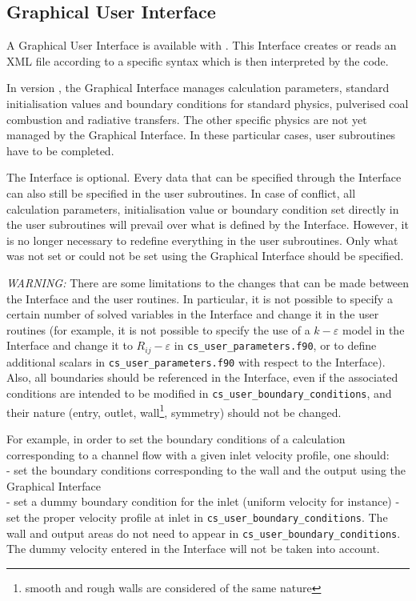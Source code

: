 {{{%
\subsection{Graphical User Interface}
\label{prg_gui}%
A Graphical User Interface is available with \CS.
This Interface creates or reads an XML file according to
a specific \CS syntax which is then interpreted by the code.

In version \verscs, the Graphical Interface manages calculation parameters,
standard initialisation values and boundary
conditions for standard physics, pulverised coal combustion and radiative
transfers. The other specific
physics are not yet managed by the Graphical
Interface. In these particular cases, user subroutines have to be completed.

The Interface is optional. Every data that can be specified through the
Interface can also still be specified in the user subroutines. In case of
conflict, all calculation parameters, initialisation value or boundary condition
set directly in the user subroutines will prevail over what is defined by the
Interface. However, it is no longer necessary to redefine everything in the
user subroutines. Only what was not set or could not be set using the Graphical
Interface should be specified.

{\em WARNING: }
There are some limitations to the changes that can be made between the Interface
and the user routines. In particular, it is not possible to specify a certain
number of solved variables in the Interface and change it in the user routines
(for example, it is not possible to specify the use of a $k-\varepsilon$ model
in the Interface and change it to $R_{ij}-\varepsilon$ in \texttt{cs\_user\_parameters.f90}, or
to define additional scalars in \texttt{cs\_user\_parameters.f90} with respect to the
Interface). Also, all boundaries should be referenced in the Interface, even if
the associated conditions are intended to be modified in \texttt{cs\_user\_boundary\_conditions}, and
their nature (entry, outlet, wall\footnote{smooth and rough walls are considered
of the same nature}, symmetry) should not be changed.

For example, in order to set the boundary conditions of a calculation
corresponding to a channel flow with a given inlet velocity profile, one
should:\\
- set the boundary conditions corresponding to the wall and the output
using the Graphical Interface\\
- set a dummy boundary condition for the inlet (uniform velocity for instance)
- set the proper velocity profile at inlet in \texttt{cs\_user\_boundary\_conditions}. The wall and
output areas do not need to appear in \texttt{cs\_user\_boundary\_conditions}. The dummy velocity
entered in the Interface will not be taken into account.

}}}
